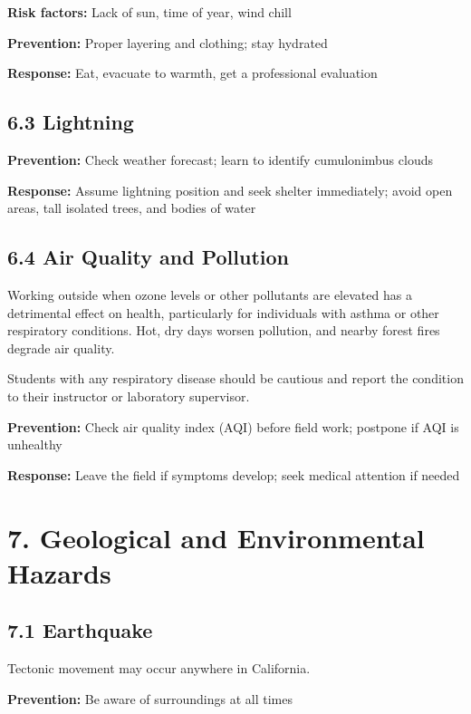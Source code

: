 \documentclass[
  11pt,
  letterpaper,
]{article}
\begin{document}
\textbf{Risk factors:} Lack of sun, time of year, wind chill

\textbf{Prevention:} Proper layering and clothing; stay hydrated

\textbf{Response:} Eat, evacuate to warmth, get a professional
evaluation

\subsection{6.3 Lightning}\label{lightning}

\textbf{Prevention:} Check weather forecast; learn to identify
cumulonimbus clouds

\textbf{Response:} Assume lightning position and seek shelter
immediately; avoid open areas, tall isolated trees, and bodies of water

\subsection{6.4 Air Quality and
Pollution}\label{air-quality-and-pollution}

Working outside when ozone levels or other pollutants are elevated has a
detrimental effect on health, particularly for individuals with asthma
or other respiratory conditions. Hot, dry days worsen pollution, and
nearby forest fires degrade air quality.

Students with any respiratory disease should be cautious and report the
condition to their instructor or laboratory supervisor.

\textbf{Prevention:} Check air quality index (AQI) before field work;
postpone if AQI is unhealthy

\textbf{Response:} Leave the field if symptoms develop; seek medical
attention if needed

\section{7. Geological and Environmental
Hazards}\label{geological-and-environmental-hazards}

\subsection{7.1 Earthquake}\label{earthquake}

Tectonic movement may occur anywhere in California.

\textbf{Prevention:} Be aware of surroundings at all times
\end{document}

